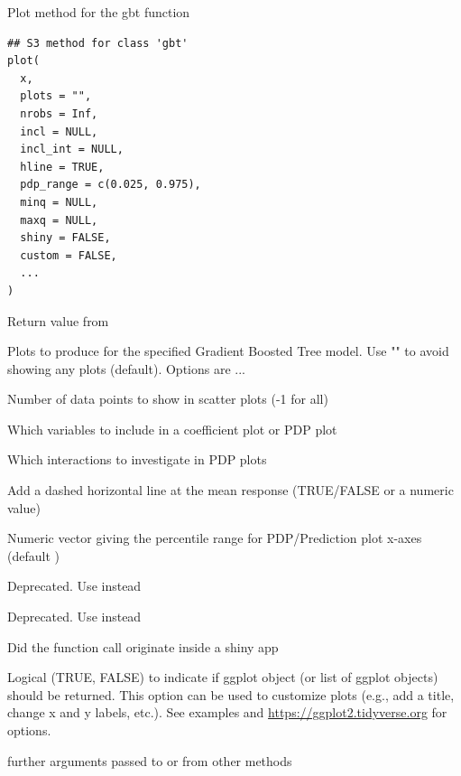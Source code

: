 \documentclass[a4paper]{book}
\begin{document}
%
\begin{Description}
Plot method for the gbt function
\end{Description}
%
\begin{Usage}
\begin{verbatim}
## S3 method for class 'gbt'
plot(
  x,
  plots = "",
  nrobs = Inf,
  incl = NULL,
  incl_int = NULL,
  hline = TRUE,
  pdp_range = c(0.025, 0.975),
  minq = NULL,
  maxq = NULL,
  shiny = FALSE,
  custom = FALSE,
  ...
)
\end{verbatim}
\end{Usage}
%
\begin{Arguments}
\begin{ldescription}
\item[\code{x}] Return value from 

\item[\code{plots}] Plots to produce for the specified Gradient Boosted Tree model. Use "" to avoid showing any plots (default). Options are ...

\item[\code{nrobs}] Number of data points to show in scatter plots (-1 for all)

\item[\code{incl}] Which variables to include in a coefficient plot or PDP plot

\item[\code{incl\_int}] Which interactions to investigate in PDP plots

\item[\code{hline}] Add a dashed horizontal line at the mean response (TRUE/FALSE or a numeric value)

\item[\code{pdp\_range}] Numeric vector  giving the percentile range for PDP/Prediction plot x-axes (default )

\item[\code{minq}] Deprecated. Use  instead

\item[\code{maxq}] Deprecated. Use  instead

\item[\code{shiny}] Did the function call originate inside a shiny app

\item[\code{custom}] Logical (TRUE, FALSE) to indicate if ggplot object (or list of ggplot objects) should be returned.
This option can be used to customize plots (e.g., add a title, change x and y labels, etc.).
See examples and \url{https://ggplot2.tidyverse.org} for options.

\item[\code{...}] further arguments passed to or from other methods
\end{ldescription}
\end{Arguments}
\end{document}
